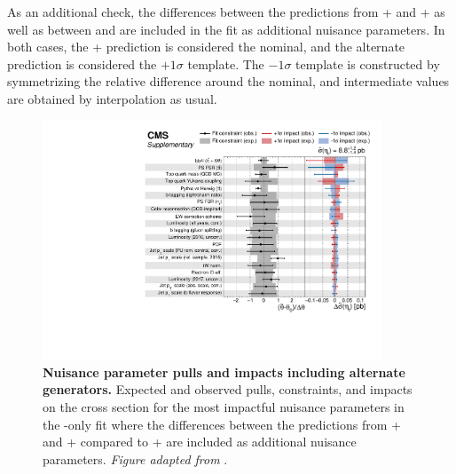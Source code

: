 As an additional check, the differences between the predictions from \powheg \hvq + \herwig and \powheg \hvq + \pythia as well as between \bbfourl and \tttWsum are included in the fit as additional nuisance parameters. In both cases, the \powheg \hvq + \pythia prediction is considered the nominal, and the alternate prediction is considered the $+1\sigma$ template. The $-1\sigma$ template is constructed by symmetrizing the relative difference around the nominal, and intermediate values are obtained by interpolation as usual.

\begin{figure}[!th]
    \centering
    \includegraphics[width=0.9\textwidth]{figures/ah/etatfit/impacts_gennps.pdf}
    \caption{
        \textbf{Nuisance parameter pulls and impacts including alternate generators.} Expected and observed pulls, constraints, and impacts on the \etat cross section for the most impactful nuisance parameters in the \etat-only fit where the differences between the predictions from \powheg \hvq + \herwig and \bbfourl + \pythia compared to \powheg \hvq + \pythia are included as additional nuisance parameters. \textit{Figure adapted from }.
    }
    \label{fig:ah:impacts_etat_gennps}
\end{figure}

